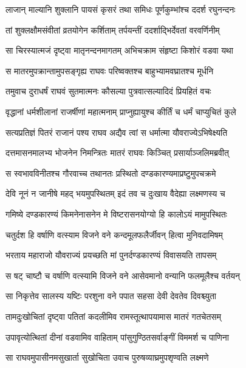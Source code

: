 \twolineshloka
{लाजान् माल्यानि शुक्लानि पायसं कृसरं तथा}
{समिधः पूर्णकुम्भांश्च ददर्श रघुनन्दनः} %

\twolineshloka
{तां शुक्लक्षौमसंवीतां व्रतयोगेन कर्शिताम्}
{तर्पयन्तीं ददर्शाद्भिर्देवतां वरवर्णिनीम्} %

\twolineshloka
{सा चिरस्यात्मजं दृष्ट्वा मातृनन्दनमागतम्}
{अभिचक्राम संहृष्टा किशोरं वडवा यथा} %

\twolineshloka
{स मातरमुपक्रान्तामुपसङ्गृह्य राघवः}
{परिष्वक्तश्च बाहुभ्यामवघ्रातश्च मूर्धनि} %

\twolineshloka
{तमुवाच दुराधर्षं राघवं सुतमात्मनः}
{कौसल्या पुत्रवात्सल्यादिदं प्रियहितं वचः} %

\twolineshloka
{वृद्धानां धर्मशीलानां राजर्षीणां महात्मनाम्}
{प्राप्नुह्यायुश्च कीर्तिं च धर्मं चाप्युचितं कुले} %

\twolineshloka
{सत्यप्रतिज्ञं पितरं राजानं पश्य राघव}
{अद्यैव त्वां स धर्मात्मा यौवराज्येऽभिषेक्ष्यति} %

\twolineshloka
{दत्तमासनमालभ्य भोजनेन निमन्त्रितः}
{मातरं राघवः किञ्चित् प्रसार्याञ्जलिमब्रवीत्} %

\twolineshloka
{स स्वभावविनीतश्च गौरवाच्च तथानतः}
{प्रस्थितो दण्डकारण्यमाप्रष्टुमुपचक्रमे} %

\twolineshloka
{देवि नूनं न जानीषे महद् भयमुपस्थितम्}
{इदं तव च दुःखाय वैदेह्या लक्ष्मणस्य च} %

\twolineshloka
{गमिष्ये दण्डकारण्यं किमनेनासनेन मे}
{विष्टरासनयोग्यो हि कालोऽयं मामुपस्थितः} %

\twolineshloka
{चतुर्दश हि वर्षाणि वत्स्याम विजने वने}
{कन्दमूलफलैर्जीवन् हित्वा मुनिवदामिषम्} %

\twolineshloka
{भरताय महाराजो यौवराज्यं प्रयच्छति}
{मां पुनर्दण्डकारण्यं विवासयति तापसम्} %

\twolineshloka
{स षट् चाष्टौ च वर्षाणि वत्स्यामि विजने वने}
{आसेवमानो वन्यानि फलमूलैश्च वर्तयन्} %

\twolineshloka
{सा निकृत्तेव सालस्य यष्टिः परशुना वने}
{पपात सहसा देवी देवतेव दिवश्च्युता} %

\twolineshloka
{तामदुःखोचितां दृष्ट्वा पतितां कदलीमिव}
{रामस्तूत्थापयामास मातरं गतचेतसम्} %

\twolineshloka
{उपावृत्योत्थितां दीनां वडवामिव वाहिताम्}
{पांसुगुण्ठितसर्वाङ्गीं विममर्श च पाणिना} %

\twolineshloka
{सा राघवमुपासीनमसुखार्ता सुखोचिता}
{उवाच पुरुषव्याघ्रमुपशृण्वति लक्ष्मणे} %

